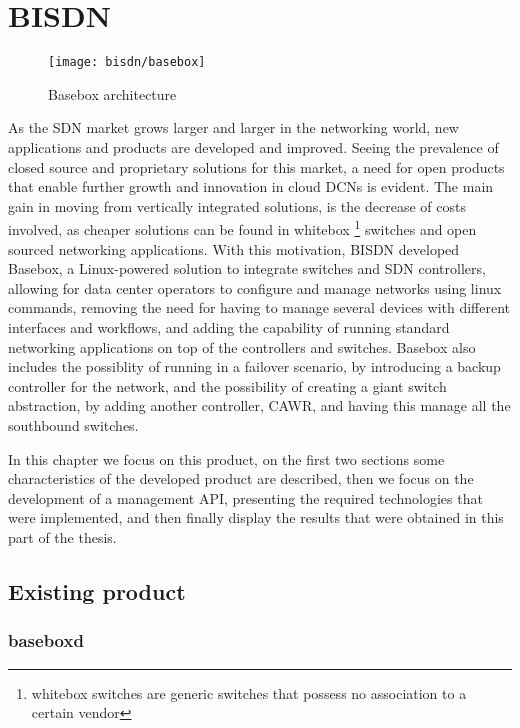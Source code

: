 \section {BISDN} \label{chap:bisdn} %

\begin{figure} [!htbp]
    \centering
    \texttt{[image: bisdn/basebox]}
    \caption{Basebox architecture}
\end{figure}

As the SDN market grows larger and larger in the networking world, new applications and products are developed and improved. Seeing the prevalence of closed source and proprietary solutions for this market, a need for open
products that enable further growth and innovation in cloud DCNs is evident. The main gain in moving from vertically integrated solutions, is the decrease of costs involved, as cheaper solutions can be found in whitebox 
\footnote {whitebox switches are generic switches that possess no association to a certain vendor} switches and open sourced networking applications. With this motivation, BISDN developed Basebox, a Linux-powered solution to integrate switches and SDN controllers, 
allowing for data center  operators to configure and manage networks using linux commands, removing the need for having to manage several devices with different interfaces and workflows, and adding the capability of running standard networking applications 
on top of the controllers and switches. Basebox also includes the possiblity of running in a failover scenario, by introducing a backup controller for the network, and the possibility of creating a giant switch abstraction, 
by adding another controller, CAWR, and having this manage all the southbound switches.

\par In this chapter we focus on this product, on the first two sections some characteristics of the developed product are described, then we focus on the development of a management API, presenting the required technologies that 
were implemented, and then finally display the results that were obtained in this part of the thesis.

\subsection {Existing product}

\subsubsection {baseboxd}

